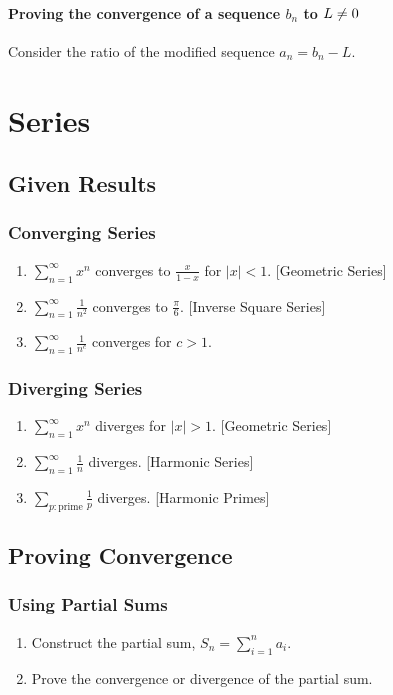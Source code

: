 \documentclass[10pt,twoside,twocolumn]{article}
\begin{document}
\paragraph{Proving the convergence of a sequence $b_{n}$ to $L\protect\neq0$}

Consider the ratio of the modified sequence $a_{n}=b_{n}-L$.


\section{Series}


\subsection{Given Results}


\subsubsection{Converging Series}
\begin{enumerate}
\item $\sum_{n=1}^{\infty}x^{n}$ converges to $\frac{x}{1-x}$ for $\left|x\right|<1$.
{[}Geometric Series{]} 
\item $\sum_{n=1}^{\infty}\frac{1}{n^{2}}$ converges to $\frac{\pi}{6}$.
{[}Inverse Square Series{]} 
\item $\sum_{n=1}^{\infty}\frac{1}{n^{c}}$ converges for $c>1$. 
\end{enumerate}

\subsubsection{Diverging Series}
\begin{enumerate}
\item $\sum_{n=1}^{\infty}x^{n}$ diverges for $\left|x\right|>1$. {[}Geometric
Series{]} 
\item $\sum_{n=1}^{\infty}\frac{1}{n}$ diverges. {[}Harmonic Series{]} 
\item $\sum_{p:\text{prime}}\frac{1}{p}$ diverges. {[}Harmonic Primes{]} 
\end{enumerate}

\subsection{Proving Convergence}


\subsubsection{Using Partial Sums}
\begin{enumerate}
\item Construct the partial sum, $S_{n}=\sum_{i=1}^{n}a_{i}$. 
\item Prove the convergence or divergence of the partial sum. 
\end{enumerate}
\end{document}
